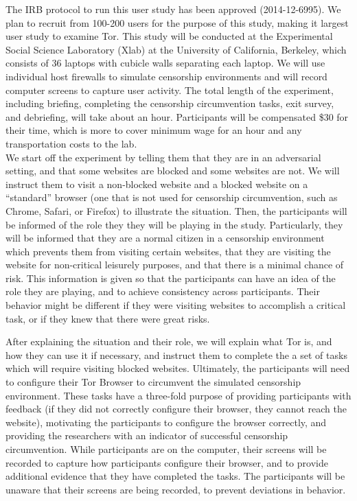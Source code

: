 \documentclass{template}
\begin{document}
The IRB protocol to run this user study has been approved (2014-12-6995). 
We plan to recruit from 100-200 users for the purpose of this study, 
making it largest user study to examine Tor.  This study will be conducted at the 
Experimental Social Science Laboratory (Xlab)
at the University of California, Berkeley, which consists of 36 laptops with 
cubicle walls separating each laptop. We will use individual host firewalls to simulate
censorship environments and will record computer screens to capture 
user activity. The total length of the experiment, including briefing, completing the censorship 
circumvention tasks, exit survey, and debriefing, will take about an hour. 
Participants will be compensated \$30 for their time, which is more to cover 
minimum wage for an hour and any transportation costs to the lab.  \\

We start off the experiment by telling them that they are in an adversarial
setting, and that some websites are blocked and some websites are not. We will
instruct them to visit a non-blocked website and a blocked website on a
``standard'' browser (one that is not used for censorship circumvention, such
as Chrome, Safari, or Firefox) to illustrate the situation.
Then, the participants will be informed of the role they they will be playing in the study. Particularly,
they will be informed that they are a normal citizen in a censorship environment
which prevents them from visiting certain websites, that they are visiting the website for non-critical leisurely purposes,
and that there is a minimal chance of risk. This information is given so that
the participants can have an idea of the role they are playing, and to achieve
consistency across participants. Their behavior might be different if they were
visiting websites to accomplish a critical task, or if they knew that there
were great risks. 

After explaining the situation and their role, we will explain what Tor is, and
how they can use it if necessary, and instruct them to complete the a set of
tasks which will require visiting blocked websites. Ultimately, the
participants will need to configure their Tor Browser to circumvent the
simulated censorship environment. These tasks have a three-fold purpose of
providing participants with feedback (if they did not correctly configure their
browser, they cannot reach the website),  motivating the participants to
configure the browser correctly, and providing the researchers with an
indicator of successful censorship circumvention. While participants are on the
computer, their screens will be recorded to capture how participants configure
their browser, and to provide additional evidence that they have completed the
tasks. The participants will be unaware that their screens are being recorded,
to prevent deviations in behavior. 
\end{document}
